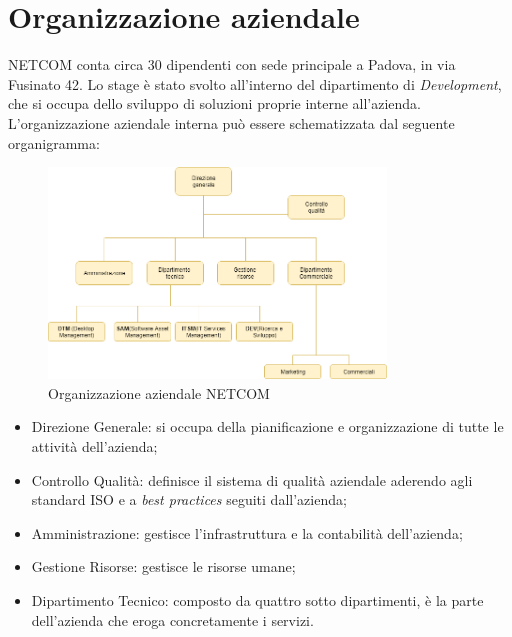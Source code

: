 \section{Organizzazione aziendale}
NETCOM conta circa 30 dipendenti con sede principale a Padova, in via Fusinato 42. 
Lo stage è stato svolto all’interno del dipartimento di \emph{Development}, che si occupa dello sviluppo di soluzioni proprie interne all’azienda. \\ L'organizzazione aziendale interna può essere schematizzata dal seguente organigramma: 
\begin{figure}[H]
    \centering
    \captionsetup{justification=centering,margin=2cm}
        \includegraphics[width=0.8\textwidth ]{figures/schemaaziendale}
        \caption [Organizzazione aziendale NETCOM]{ Organizzazione aziendale NETCOM \label{fig:organigramma}}
\end{figure}
\begin{itemize}
    \item Direzione Generale: si occupa della pianificazione e organizzazione di tutte le attività dell’azienda;
    \item Controllo Qualità: definisce il sistema di qualità aziendale aderendo agli standard ISO e a \textit{best practices} seguiti dall'azienda;
    \item Amministrazione: gestisce l’infrastruttura e la contabilità dell’azienda;
    \item Gestione Risorse: gestisce le risorse umane;
    \item Dipartimento Tecnico: composto da quattro sotto dipartimenti, è la parte dell’azienda che eroga concretamente i servizi.
\end{itemize}

